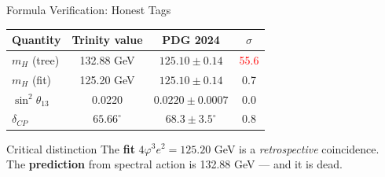 \documentclass[aspectratio=169,11pt]{beamer}
\newcommand{\ph}{\varphi}
\begin{document}
\begin{frame}{Formula Verification: Honest Tags}
  \begin{center}
    \begin{tabular}{lccc}
      \toprule
      Quantity & Trinity value & PDG 2024 & $\sigma$ \\
      \midrule
      $m_H$ (tree) & 132.88 GeV & $125.10 \pm 0.14$ & \textcolor{red}{55.6} \\
      $m_H$ (fit) & 125.20 GeV & $125.10 \pm 0.14$ & 0.7 \\
      $\sin^2\theta_{13}$ & 0.0220 & $0.0220 \pm 0.0007$ & 0.0 \\
      $\delta_{CP}$ & $65.66^\circ$ & $68.3 \pm 3.5^\circ$ & 0.8 \\
      \bottomrule
    \end{tabular}
  \end{center}
  \vfill
  \begin{alertblock}{Critical distinction}
    The \textbf{fit} $4\ph^3 e^2 = 125.20$ GeV is a \emph{retrospective} coincidence.\\
    The \textbf{prediction} from spectral action is 132.88 GeV --- and it is dead.
  \end{alertblock}
\end{frame}
\end{document}
